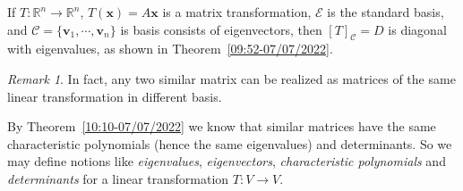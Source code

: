 \documentclass{beamer}
\theoremstyle{definition}
\theoremstyle{remark}
\newtheorem*{remark}{Remark}
\begin{document}
\begin{frame}[t]
\begin{definition}
\begin{center}
\end{center}
If $T:\mathbb R^n\to\mathbb R^n$, $T(\mathbf x)=A\mathbf x$ is a matrix transformation, $\mathcal E$ is the standard basis, and $\mathcal C=\{\mathbf v_1,\cdots,\mathbf v_n\}$ is basis consists of eigenvectors, then $[T]_{\mathcal C}=D$ is diagonal with eigenvalues, as shown in Theorem~\ref{09:52-07/07/2022}.
\end{definition}
\end{frame}

\begin{frame}[t]
\begin{remark}
In fact, any two similar matrix can be realized as matrices of the same linear transformation in different basis.
\end{remark}
\pause
\begin{definition}
By Theorem~\ref{10:10-07/07/2022} we know that similar matrices have the same characteristic polynomials (hence the same eigenvalues) and determinants. So we may define notions like \textit{eigenvalues}, \textit{eigenvectors}, \textit{characteristic polynomials} and \textit{determinants} for a linear transformation $T:V\to V$.
\end{definition}
\end{frame}
\end{document}
